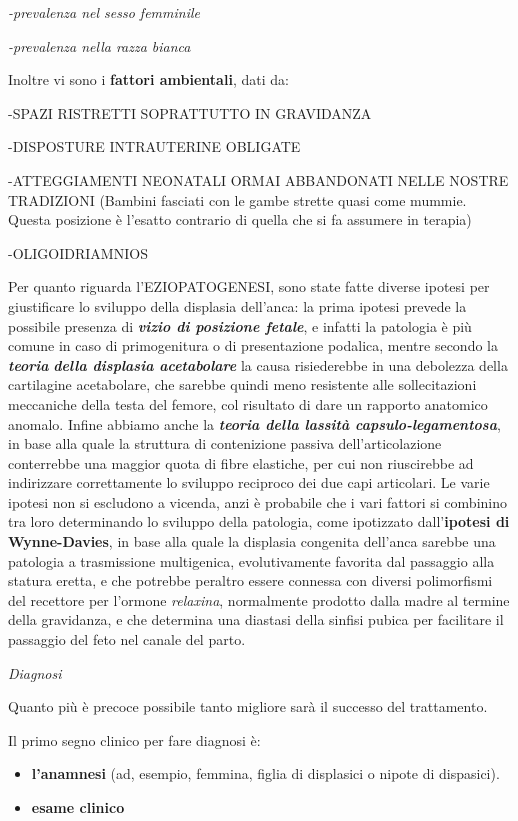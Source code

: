 \documentclass[]{article}
\begin{document}
\emph{-prevalenza nel sesso femminile}

\emph{-prevalenza nella razza bianca}

Inoltre vi sono i \textbf{fattori ambientali}, dati da:

-SPAZI RISTRETTI SOPRATTUTTO IN GRAVIDANZA

-DISPOSTURE INTRAUTERINE OBLIGATE

-ATTEGGIAMENTI NEONATALI ORMAI ABBANDONATI NELLE NOSTRE TRADIZIONI
(Bambini fasciati con le gambe strette quasi come mummie. Questa
posizione è l'esatto contrario di quella che si fa assumere in terapia)

-OLIGOIDRIAMNIOS

Per quanto riguarda l'EZIOPATOGENESI, sono state fatte diverse ipotesi
per giustificare lo sviluppo della displasia dell'anca: la prima ipotesi
prevede la possibile presenza di \textbf{\emph{vizio di posizione
fetale}}, e infatti la patologia è più comune in caso di primogenitura o
di presentazione podalica, mentre secondo la \textbf{\emph{teoria}}
\textbf{\emph{della displasia acetabolare}} la causa risiederebbe in una
debolezza della cartilagine acetabolare, che sarebbe quindi meno
resistente alle sollecitazioni meccaniche della testa del femore, col
risultato di dare un rapporto anatomico anomalo. Infine abbiamo anche la
\textbf{\emph{teoria della lassità capsulo-legamentosa}}, in base alla
quale la struttura di contenizione passiva dell'articolazione
conterrebbe una maggior quota di fibre elastiche, per cui non
riuscirebbe ad indirizzare correttamente lo sviluppo reciproco dei due
capi articolari. Le varie ipotesi non si escludono a vicenda, anzi è
probabile che i vari fattori si combinino tra loro determinando lo
sviluppo della patologia, come ipotizzato dall'\textbf{ipotesi di
Wynne-Davies}, in base alla quale la displasia congenita dell'anca
sarebbe una patologia a trasmissione multigenica, evolutivamente
favorita dal passaggio alla statura eretta, e che potrebbe peraltro
essere connessa con diversi polimorfismi del recettore per l'ormone
\emph{relaxina}, normalmente prodotto dalla madre al termine della
gravidanza, e che determina una diastasi della sinfisi pubica per
facilitare il passaggio del feto nel canale del parto.

\emph{Diagnosi}

Quanto più è precoce possibile tanto migliore sarà il successo del
trattamento.

Il primo segno clinico per fare diagnosi è:

\begin{itemize}
\item
  \textbf{l'anamnesi} (ad, esempio, femmina, figlia di displasici o
  nipote di dispasici).
\item
  \textbf{esame clinico}
\end{itemize}
\end{document}

